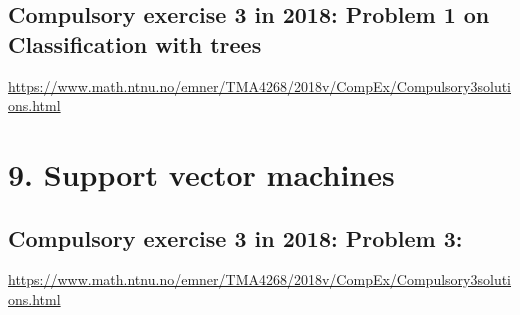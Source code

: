 \documentclass[]{article}
\begin{document}
\subsection{Compulsory exercise 3 in 2018: Problem 1 on Classification
with
trees}\label{compulsory-exercise-3-in-2018-problem-1-on-classification-with-trees}

\url{https://www.math.ntnu.no/emner/TMA4268/2018v/CompEx/Compulsory3solutions.html}

\section{9. Support vector machines}\label{support-vector-machines}

\subsection{Compulsory exercise 3 in 2018: Problem
3:}\label{compulsory-exercise-3-in-2018-problem-3}

\url{https://www.math.ntnu.no/emner/TMA4268/2018v/CompEx/Compulsory3solutions.html}
\end{document}
